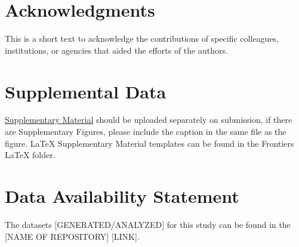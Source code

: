 \documentclass[utf8]{frontiersSCNS} %
\begin{document}
\section*{Acknowledgments}
This is a short text to acknowledge the contributions of specific colleagues, institutions, or agencies that aided the efforts of the authors.

\section*{Supplemental Data}
 \href{http://home.frontiersin.org/about/author-guidelines#SupplementaryMaterial}{Supplementary Material} should be uploaded separately on submission, if there are Supplementary Figures, please include the caption in the same file as the figure. LaTeX Supplementary Material templates can be found in the Frontiers LaTeX folder.

\section*{Data Availability Statement}
The datasets [GENERATED/ANALYZED] for this study can be found in the [NAME OF REPOSITORY] [LINK].





\end{document}
